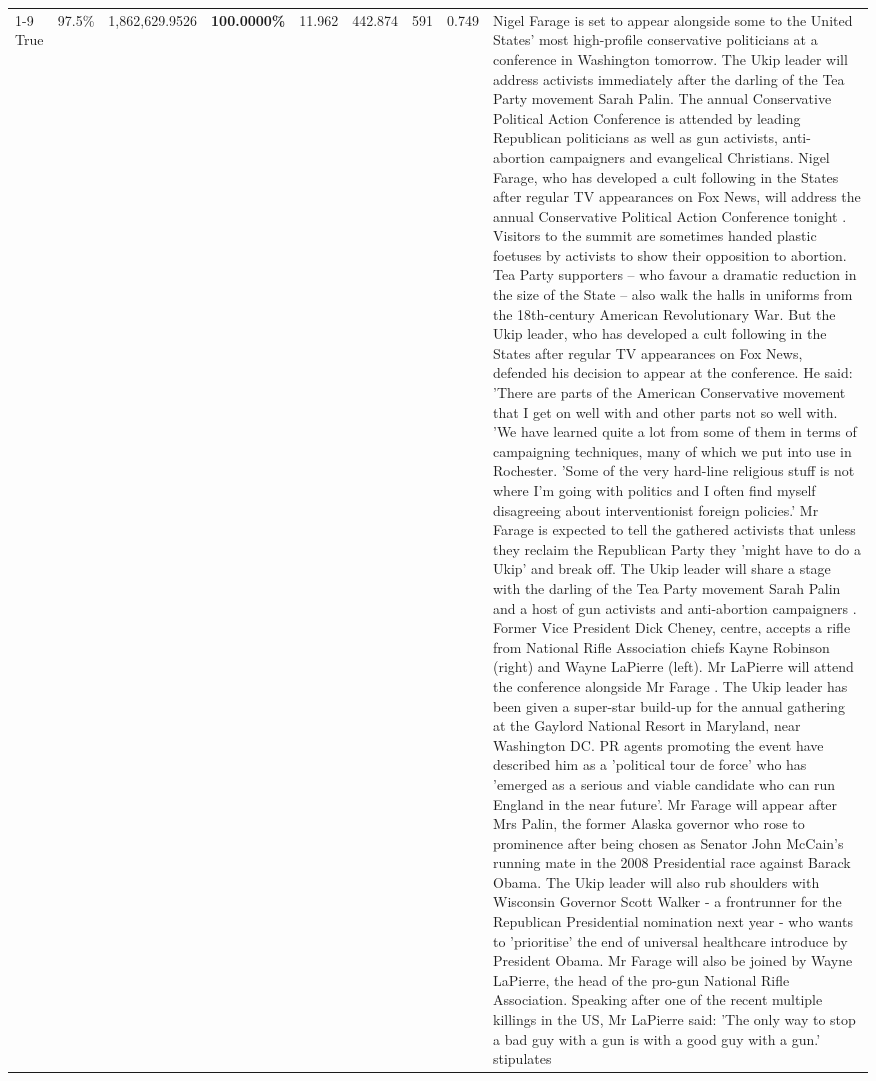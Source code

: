 \begin{table}[H]
\begin{tabular}{lllrlllll}
\cline{1-9}
True & 97.5\% & 1,862,629.9526 & \bfseries \color{red} 100.0000\% & 11.962 & 442.874 & 591 & 0.749 & Nigel Farage is set to appear alongside some to the United States' most high-profile conservative politicians at a conference in Washington tomorrow. The Ukip leader will address activists immediately after the darling of the Tea Party movement Sarah Palin. The annual Conservative Political Action Conference is attended by leading Republican politicians as well as gun activists, anti-abortion campaigners and evangelical Christians. Nigel Farage, who has developed a cult following in the States after regular TV appearances on Fox News, will address the annual Conservative Political Action Conference tonight . Visitors to the summit are sometimes handed plastic foetuses by activists to show their opposition to abortion. Tea Party supporters – who favour a dramatic reduction in the size of the State – also walk the halls in uniforms from the 18th-century American Revolutionary War. But the Ukip leader, who has developed a cult following in the States after regular TV appearances on Fox News, defended his decision to appear at the conference. He said: 'There are parts of the American Conservative movement that I get on well with and other parts not so well with. 'We have learned quite a lot from some of them in terms of campaigning techniques, many of which we put into use in Rochester. 'Some of the very hard-line religious stuff is not where I'm going with politics and I often find myself disagreeing about interventionist foreign policies.' Mr Farage is expected to tell the gathered activists that unless they reclaim the Republican Party they 'might have to do a Ukip' and break off. The Ukip leader will share a stage with the darling of the Tea Party movement Sarah Palin and a host of gun activists and anti-abortion campaigners . Former Vice President Dick Cheney, centre, accepts a rifle from National Rifle Association chiefs Kayne Robinson (right) and Wayne LaPierre (left). Mr LaPierre will attend the conference alongside Mr Farage . The Ukip leader has been given a super-star build-up for the annual gathering at the Gaylord National Resort in Maryland, near Washington DC. PR agents promoting the event have described him as a 'political tour de force' who has 'emerged as a serious and viable candidate who can run England in the near future'. Mr Farage will appear after Mrs Palin, the former Alaska governor who rose to prominence after being chosen as Senator John McCain's running mate in the 2008 Presidential race against Barack Obama. The Ukip leader will also rub shoulders with Wisconsin Governor Scott Walker - a frontrunner for the Republican Presidential nomination next year - who wants to 'prioritise' the end of universal healthcare introduce by President Obama. Mr Farage will also be joined by Wayne LaPierre, the head of the pro-gun National Rifle Association. Speaking after one of the recent multiple killings in the US, Mr LaPierre said: 'The only way to stop a bad guy with a gun is with a good guy with a gun.' stipulates \\

\end{tabular}
\end{table}
